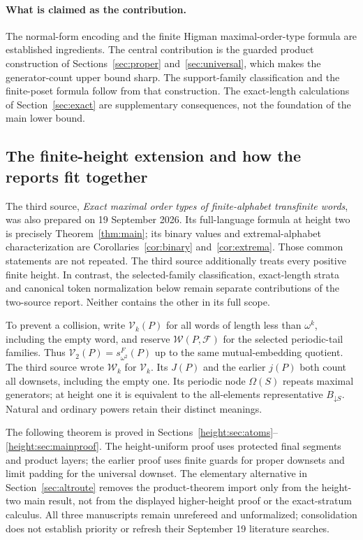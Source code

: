 \documentclass[11pt,a4paper]{article}
\numberwithin{equation}{section}
\theoremstyle{definition}
\theoremstyle{remark}
\newcommand{\W}{\mathcal W}
\newcommand{\F}{\mathcal F}
\newcommand{\down}{\mathord{\downarrow}}
\newcommand{\Wordspace}[1]{s_{\omega^2}^{F}(#1)}
\newcommand{\Vheight}{\mathcal V}
\begin{document}
\paragraph{What is claimed as the contribution.}
The normal-form encoding and the finite Higman maximal-order-type formula are
established ingredients. The central contribution is the guarded product
construction of Sections~\ref{sec:proper} and~\ref{sec:universal}, which makes
the generator-count upper bound sharp. The support-family classification and
the finite-poset formula follow from that construction. The exact-length
calculations of Section~\ref{sec:exact} are supplementary consequences, not
the foundation of the main lower bound.


\subsection{The finite-height extension and how the reports fit together}
\label{merge:height-intro}
The third source, \emph{Exact maximal order types of finite-alphabet
transfinite words}, was also prepared on 19 September 2026. Its full-language
formula at height two is precisely Theorem~\ref{thm:main}; its binary values
and extremal-alphabet characterization are Corollaries~\ref{cor:binary}
and~\ref{cor:extrema}. Those common statements are not repeated.
The third source additionally treats every positive finite height. In contrast,
the selected-family classification, exact-length strata and canonical token
normalization below remain separate contributions of the two-source report.
Neither contains the other in its full scope.

To prevent a collision, write $\Vheight_k(P)$ for all words of length less
than $\omega^k$, including the empty word, and reserve $\W(P,\F)$ for the
selected periodic-tail families. Thus $\Vheight_2(P)=\Wordspace P$ up to the
same mutual-embedding quotient. The third source wrote $\mathcal W_k$ for
$\Vheight_k$. Its $J(P)$ and the earlier $j(P)$ both count all downsets,
including the empty one. Its periodic node $\Omega(S)$ repeats maximal
generators; at height one it is equivalent to the all-elements representative
$B_{\down S}$. Natural and ordinary powers retain their distinct meanings.

The following theorem is proved in
Sections~\ref{height:sec:atoms}--\ref{height:sec:mainproof}.
The height-uniform proof uses protected final segments and product layers;
the earlier proof uses finite guards for proper downsets and limit padding
for the universal downset. The elementary alternative in
Section~\ref{sec:altroute} removes the product-theorem import only from the
height-two main result, not from the displayed higher-height proof or the
exact-stratum calculus. All three manuscripts remain unrefereed and
unformalized; consolidation does not establish priority or refresh their
September 19 literature searches.
\end{document}
